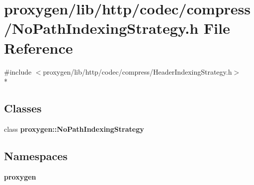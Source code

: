 \section{proxygen/lib/http/codec/compress/\+No\+Path\+Indexing\+Strategy.h File Reference}
\label{NoPathIndexingStrategy_8h}
{\ttfamily \#include $<$proxygen/lib/http/codec/compress/\+Header\+Indexing\+Strategy.\+h$>$}\\*
\subsection*{Classes}
\begin{DoxyCompactItemize}
\item 
class {\bf proxygen\+::\+No\+Path\+Indexing\+Strategy}
\end{DoxyCompactItemize}
\subsection*{Namespaces}
\begin{DoxyCompactItemize}
\item 
 {\bf proxygen}
\end{DoxyCompactItemize}
